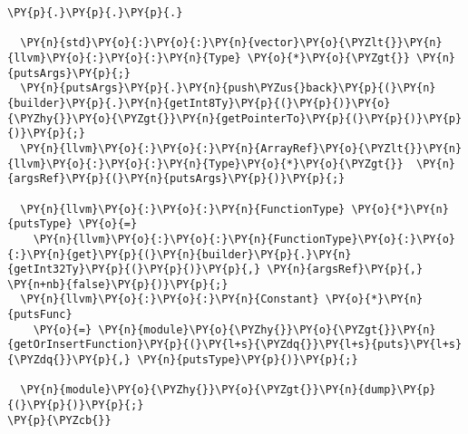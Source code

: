 \begin{Verbatim}[commandchars=\\\{\}]
          \PY{p}{.}\PY{p}{.}\PY{p}{.}

  \PY{n}{std}\PY{o}{:}\PY{o}{:}\PY{n}{vector}\PY{o}{\PYZlt{}}\PY{n}{llvm}\PY{o}{:}\PY{o}{:}\PY{n}{Type} \PY{o}{*}\PY{o}{\PYZgt{}} \PY{n}{putsArgs}\PY{p}{;}
  \PY{n}{putsArgs}\PY{p}{.}\PY{n}{push\PYZus{}back}\PY{p}{(}\PY{n}{builder}\PY{p}{.}\PY{n}{getInt8Ty}\PY{p}{(}\PY{p}{)}\PY{o}{\PYZhy{}}\PY{o}{\PYZgt{}}\PY{n}{getPointerTo}\PY{p}{(}\PY{p}{)}\PY{p}{)}\PY{p}{;}
  \PY{n}{llvm}\PY{o}{:}\PY{o}{:}\PY{n}{ArrayRef}\PY{o}{\PYZlt{}}\PY{n}{llvm}\PY{o}{:}\PY{o}{:}\PY{n}{Type}\PY{o}{*}\PY{o}{\PYZgt{}}  \PY{n}{argsRef}\PY{p}{(}\PY{n}{putsArgs}\PY{p}{)}\PY{p}{;}

  \PY{n}{llvm}\PY{o}{:}\PY{o}{:}\PY{n}{FunctionType} \PY{o}{*}\PY{n}{putsType} \PY{o}{=} 
    \PY{n}{llvm}\PY{o}{:}\PY{o}{:}\PY{n}{FunctionType}\PY{o}{:}\PY{o}{:}\PY{n}{get}\PY{p}{(}\PY{n}{builder}\PY{p}{.}\PY{n}{getInt32Ty}\PY{p}{(}\PY{p}{)}\PY{p}{,} \PY{n}{argsRef}\PY{p}{,} \PY{n+nb}{false}\PY{p}{)}\PY{p}{;}
  \PY{n}{llvm}\PY{o}{:}\PY{o}{:}\PY{n}{Constant} \PY{o}{*}\PY{n}{putsFunc}
    \PY{o}{=} \PY{n}{module}\PY{o}{\PYZhy{}}\PY{o}{\PYZgt{}}\PY{n}{getOrInsertFunction}\PY{p}{(}\PY{l+s}{\PYZdq{}}\PY{l+s}{puts}\PY{l+s}{\PYZdq{}}\PY{p}{,} \PY{n}{putsType}\PY{p}{)}\PY{p}{;}

  \PY{n}{module}\PY{o}{\PYZhy{}}\PY{o}{\PYZgt{}}\PY{n}{dump}\PY{p}{(}\PY{p}{)}\PY{p}{;}
\PY{p}{\PYZcb{}}
\end{Verbatim}
